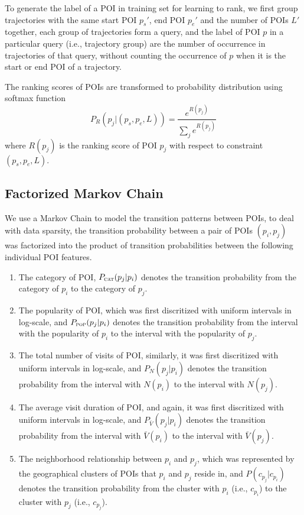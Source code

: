To generate the label of a POI in training set for learning to rank,
we first group trajectories with the same start POI $p_s'$, end POI $p_e'$ and the number of POIs $L'$ together,
each group of trajectories form a query,
and the label of POI $p$ in a particular query (i.e., trajectory group) are the number of occurrence
in trajectories of that query, 
without counting the occurrence of $p$ when it is the start or end POI of a trajectory.

The ranking scores of POIs are transformed to probability distribution using softmax function
\begin{displaymath}
    P_R(p_j |(p_s, p_e, L)) = \frac{e^{R(p_j)}}{\sum_j e^{R(p_j)}}
\end{displaymath}
where $R(p_j)$ is the ranking score of POI $p_j$ with respect to constraint $(p_s, p_e, L)$.


\subsection{Factorized Markov Chain}
\label{method:transition}
We use a Markov Chain to model the transition patterns between POIs,
to deal with data sparsity,
the transition probability between a pair of POIs $(p_i, p_j)$ was factorized into the product of
transition probabilities between the following individual POI features.
\begin{enumerate}
\item The category of POI, $P_{\textsc{cat}}(p_j | p_i)$
      denotes the transition probability from the category of $p_i$ to the category of $p_j$.
\item The popularity of POI, which was first discritized with uniform intervals in log-scale,
      and $P_{\textsc{pop}}(p_j | p_i)$ denotes the transition probability from the interval with the popularity of
      $p_i$ to the interval with the popularity of $p_j$.
\item The total number of visits of POI, similarly, it was first discritized with uniform intervals in log-scale,
      and $P_N(p_j | p_i)$ denotes the transition probability from the interval with $N(p_i)$ 
      to the interval with $N(p_j)$.
\item The average visit duration of POI, and again, it was first discritized with uniform intervals in log-scale,
      and $P_{\bar{V}}(p_j | p_i)$ denotes the transition probability from the interval with $\bar{V}(p_i)$ 
      to the interval with $\bar{V}(p_j)$.
\item The neighborhood relationship between $p_i$ and $p_j$,
      which was represented by the geographical clusters of POIs that $p_i$ and $p_j$ reside in,
      and $P(c_{p_j} | c_{p_i})$ denotes the transition probability from the cluster with 
      $p_i$ (i.e., $c_{p_i}$) to the cluster with $p_j$ (i.e., $c_{p_j}$).
\end{enumerate}

